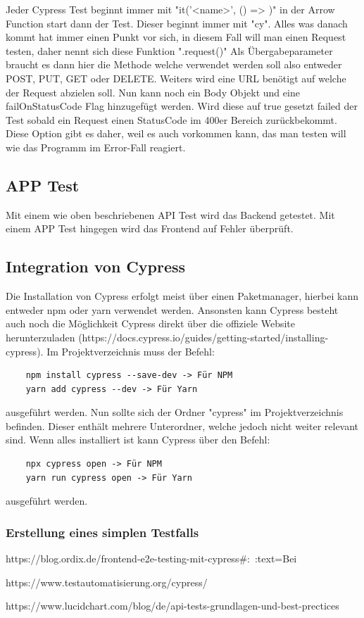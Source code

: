 Jeder Cypress Test beginnt immer mit "it('<name>', () => {})" in der Arrow Function start dann der Test. Dieser beginnt immer mit "cy". Alles was danach kommt hat immer einen Punkt vor sich, in diesem Fall will man einen Request testen, daher nennt sich diese Funktion ".request({})" Als Übergabeparameter braucht es dann hier die Methode welche verwendet werden soll also entweder POST, PUT, GET oder DELETE. Weiters wird eine URL benötigt auf welche der Request abzielen soll. Nun kann noch ein Body Objekt und eine failOnStatusCode Flag hinzugefügt werden. Wird diese auf true gesetzt failed der Test sobald ein Request einen StatusCode im 400er Bereich zurückbekommt. Diese Option gibt es daher, weil es auch vorkommen kann, das man testen will wie das Programm im Error-Fall reagiert.

\subsection{APP Test}
Mit einem wie oben beschriebenen API Test wird das Backend getestet. Mit einem APP Test hingegen wird das Frontend auf Fehler überprüft. 


\subsection{Integration von Cypress}
Die Installation von Cypress erfolgt meist über einen Paketmanager, hierbei kann entweder npm oder yarn verwendet werden. Ansonsten kann Cypress besteht auch noch die Möglichkeit Cypress direkt über die offiziele Website herunterzuladen (https://docs.cypress.io/guides/getting-started/installing-cypress).
Im Projektverzeichnis muss der Befehl:

\begin{lstlisting}
    npm install cypress --save-dev -> Für NPM
    yarn add cypress --dev -> Für Yarn
\end{lstlisting}

ausgeführt werden.
Nun sollte sich der Ordner "cypress" im Projektverzeichnis befinden. Dieser enthält mehrere Unterordner, welche jedoch nicht weiter relevant sind. Wenn alles installiert ist kann Cypress über den Befehl:

\begin{lstlisting}
    npx cypress open -> Für NPM
    yarn run cypress open -> Für Yarn
\end{lstlisting}

ausgeführt werden.

\subsubsection{Erstellung eines simplen Testfalls}


\cite{Integration_von_Cypress}
https://blog.ordix.de/frontend-e2e-testing-mit-cypress#:~:text=Bei%

\cite{Cypress}
https://www.testautomatisierung.org/cypress/

\cite{API_Tests}
https://www.lucidchart.com/blog/de/api-tests-grundlagen-und-best-prectices